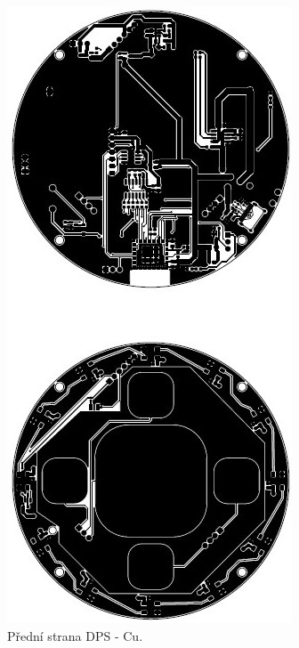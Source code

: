 \begin{figure}[!h]
	\begin{center}
	  \includegraphics[scale=1.1]{obrazky/Vyrobni_podkady_F_Cu.jpg}
	\end{center}
	\caption[Přední strana DPS - Cu]{Přední strana DPS - Cu.}
\end{figure}

